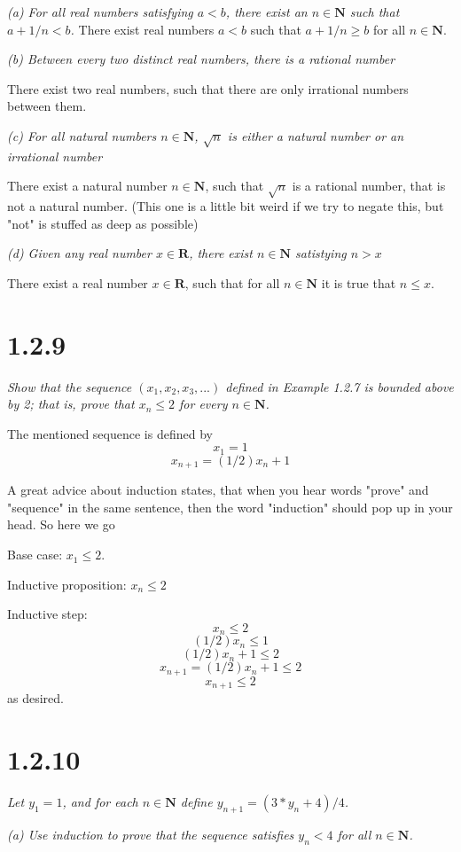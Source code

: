 \documentclass[11pt,oneside,titlepage]{book}
\begin{document}
\textit{(a) For all real numbers satisfying $a < b$, there exist an $n \in
  \textbf{N}$ such that $a + 1/n < b$.}
There exist real numbers $a < b$ such that $a + 1/n \geq b$ for all $n \in \textbf{N}$.

\textit{(b) Between every two distinct real numbers, there is a rational number}

There exist two real numbers, such that there are only irrational numbers
between them.

\textit{(c) For all natural numbers $n \in \textbf{N}$, $\sqrt{n}$ is either a
  natural number  or an irrational number}

There exist a natural number $n \in \textbf{N}$, such that $\sqrt{n}$ is a
rational number, that is not a natural number. (This one is a little bit weird
if we try to negate this, but "not" is stuffed as deep as possible)

\textit{(d) Given any real number $x \in \textbf{R}$, there exist $n \in
  \textbf{N}$ satistying $n > x$}

There exist a real number $x \in \textbf{R}$, such that for all $n \in \textbf{N}$ it is true that $n \leq x$.

\section*{1.2.9}
\textit{Show that the sequence $(x_1, x_2, x_3,...)$ defined in Example 1.2.7
  is bounded above by 2; that is, prove that $x_n \leq 2$ for every $n \in
  \textbf{N}$.}

The mentioned sequence is defined by
$$x_1 = 1$$
$$x_{n + 1} = (1/2)x_n + 1$$

A great advice about induction states, that when you hear words "prove" and
"sequence" in the same sentence, then the word "induction" should pop up in
your head. So here we go

Base case: $x_1 \leq 2$.

Inductive proposition: $x_n \leq 2$

Inductive step:
$$x_n \leq 2$$
$$(1/2)x_n \leq 1$$
$$(1/2)x_n + 1 \leq 2$$
$$x_{n + 1} = (1/2)x_n + 1 \leq 2$$
$$x_{n + 1} \leq 2$$
as desired.

\section*{1.2.10}
\textit{Let $y_1 = 1$, and for each $n \in \textbf{N}$ define $y_{n + 1} =
  (3 * y_n + 4) / 4$.}

\textit{(a) Use induction to prove that the sequence satisfies $y_n < 4$ for
  all $n \in \textbf{N}$.}
\end{document}
